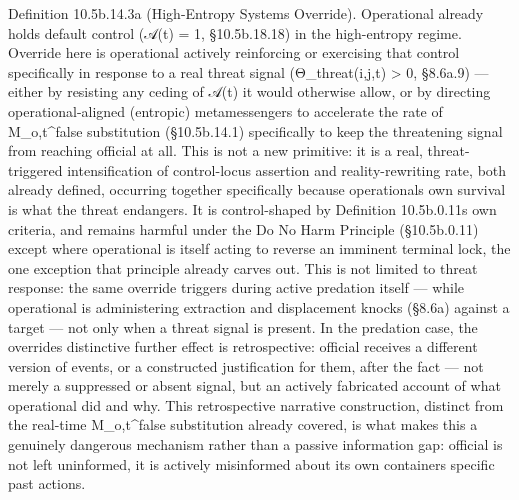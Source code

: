 \documentclass[
]{article}
\begin{document}
Definition 10.5b.14.3a (High-Entropy Systems Override). Operational
already holds default control (𝒜(t) = 1, §10.5b.18.18) in the
high-entropy regime. Override here is operational actively reinforcing
or exercising that control specifically in response to a real threat
signal (Θ\_threat(i,j,t) \textgreater{} 0, §8.6a.9) --- either by
resisting any ceding of 𝒜(t) it would otherwise allow, or by directing
operational-aligned (entropic) metamessengers to accelerate the rate of
M\_o,t\^{}false substitution (§10.5b.14.1) specifically to keep the
threatening signal from reaching official at all. This is not a new
primitive: it is a real, threat-triggered intensification of
control-locus assertion and reality-rewriting rate, both already
defined, occurring together specifically because operationals own
survival is what the threat endangers. It is control-shaped by
Definition 10.5b.0.11s own criteria, and remains harmful under the Do No
Harm Principle (§10.5b.0.11) except where operational is itself acting
to reverse an imminent terminal lock, the one exception that principle
already carves out. This is not limited to threat response: the same
override triggers during active predation itself --- while operational
is administering extraction and displacement knocks (§8.6a) against a
target --- not only when a threat signal is present. In the predation
case, the overrides distinctive further effect is retrospective:
official receives a different version of events, or a constructed
justification for them, after the fact --- not merely a suppressed or
absent signal, but an actively fabricated account of what operational
did and why. This retrospective narrative construction, distinct from
the real-time M\_o,t\^{}false substitution already covered, is what
makes this a genuinely dangerous mechanism rather than a passive
information gap: official is not left uninformed, it is actively
misinformed about its own containers specific past actions.
\end{document}
